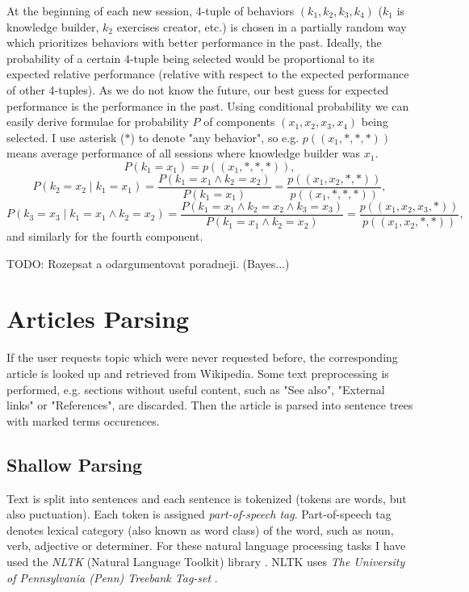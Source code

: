 \documentclass[a4paper, 12pt, twoside]{fithesis2}		%
\renewcommand{\_}{\leavevmode \kern0.07em\vbox{\hrule width0.4em}}
\begin{document}
At the beginning of each new session, 4-tuple of behaviors $(k_1, k_2, k_3, k_4)$ ($k_1$ is knowledge builder, $k_2$ exercises creator, etc.) is chosen in a partially random way
which prioritizes behaviors with better performance in the past.
Ideally, the probability of a certain 4-tuple being selected would be proportional to its expected relative performance
(relative with respect to the expected performance of other 4-tuples).
As we do not know the future, our best guess for expected performance is the performance in the past.
Using conditional probability we can easily derive formulae for probability $P$ of components $(x_1, x_2, x_3, x_4)$ being selected.
I use asterisk ($*$) to denote "any behavior", so e.g. $p((x_1, *, *, *))$ means average performance of all sessions where knowledge builder was $x_1$.
$$
P(k_1 = x_1) = p((x_1, *, *, *)),
$$
$$
P(k_2 = x_2 \mid k_1 = x_1)
  = \frac{P(k_1 = x_1 \land k_2 = x_2)}{P(k_1 = x_1)}
  = \frac{p((x_1, x_2, *, *))}{p((x_1, *, *, *))},
$$
$$
P(k_3 = x_3 \mid k_1 = x_1 \land k_2 = x_2)
  = \frac{P(k_1 = x_1 \land k_2 = x_2 \land k_3 = x_3)}{P(k_1 = x_1 \land k_2 = x_2)}
  = \frac{p((x_1, x_2, x_3, *))}{p((x_1, x_2, *, *))},
$$
and similarly for the fourth component.



TODO: Rozepsat a odargumentovat poradneji. (Bayes...)


\section{Articles Parsing}
\label{sec:articles-parsing}

If the user requests topic which were never requested before,
the corresponding article is looked up and retrieved from Wikipedia.
Some text preprocessing is performed, e.g. sections without useful content, such as "See also", "External links" or "References", are discarded.
Then the article is parsed into sentence trees with marked terms occurences.

\subsection*{Shallow Parsing}
Text is split into sentences and each sentence is tokenized (tokens are words, but also puctuation).
    Each token is assigned \textit{part-of-speech tag}.
    Part-of-speech tag denotes lexical category (also known as word class) of the word, such as noun, verb, adjective or determiner.
    For these natural language processing tasks I have used the \textit{NLTK} (Natural Language Toolkit) library \cite{nlp-python}. NLTK uses \textit{The University of Pennsylvania (Penn) Treebank Tag-set} \cite{penn-tagset}.
\end{document}
